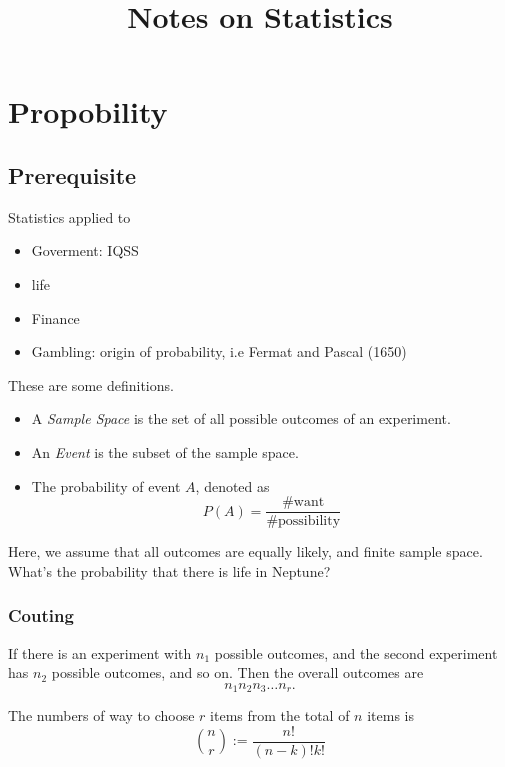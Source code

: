 
\title{Notes on Statistics}


\maketitle

\chapter{Propobility}
\section{Prerequisite}
Statistics applied to 
\begin{itemize}
  \item Goverment: IQSS
  \item life
  \item Finance
  \item Gambling: origin of probability, i.e Fermat and Pascal (1650)
\end{itemize}

\begin{definition}
  These are some definitions.
  \begin{itemize}
    \item A \emph{Sample Space} is the set of all possible outcomes of an experiment.
    \item An \emph{Event} is the subset of the sample space.
    \item The probability of event $A$, denoted as 
      $$P(A)=\frac{\text{\#want}}{\text{\#possibility}}$$
  \end{itemize}
\end{definition}
Here, we assume that all outcomes are equally likely, and finite
sample space. What's the probability that there is life in Neptune?

\subsection{Couting}
\begin{theorem}
  If there is an experiment with $n_1$ possible outcomes, and 
  the second experiment has $n_2$ possible outcomes, and so on.
  Then the overall outcomes are
  \[n_1n_2n_3\dots n_r.\]
\end{theorem}
\begin{theorem}
  The numbers of way to choose $r$ items from the total of 
  $n$ items is
  \[\binom{n}{r}:=\frac{n!}{(n-k)!k!}\]
\end{theorem}






